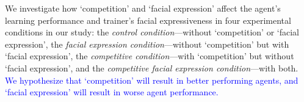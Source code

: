 We investigate how `competition' and `facial expression' affect %
the agent's learning performance and trainer's facial expressiveness in four experimental conditions in our study: the \emph{control condition}---without `competition' or `facial expression', the \emph{facial expression condition}---without `competition' but with `facial expression', the \emph{competitive condition}---with `competition' but without `facial expression', and the \emph{competitive facial expression con\-dition}---with both. \textcolor{blue}{We hypothesize that `competition' will result in better performing agents, and `facial expression' will %
result in worse agent performance.} %

